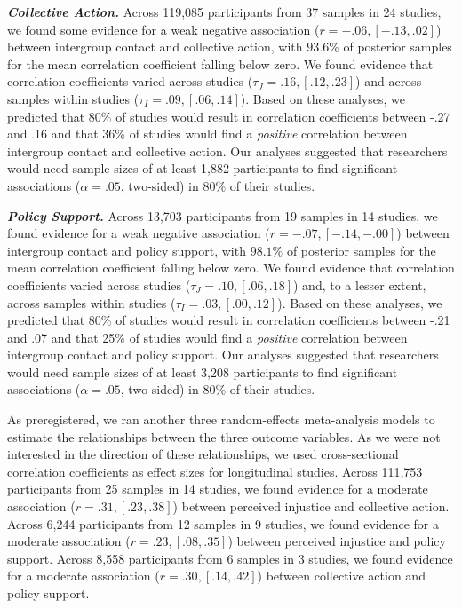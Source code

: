\documentclass[12pt, letterpaper]{article}
\begin{document}
\textbf{\emph{Collective Action.}} Across 119,085 participants from 37
samples in 24 studies, we found some evidence for a weak negative
association (\(r = -.06, [-.13, .02]\)) between intergroup contact and
collective action, with \(93.6\%\) of posterior samples for the mean
correlation coefficient falling below zero. We found evidence that
correlation coefficients varied across studies
(\(\tau_J = .16, [.12, .23]\)) and across samples within studies
(\(\tau_I = .09, [.06, .14]\)). Based on these analyses, we predicted
that 80\% of studies would result in correlation coefficients between
-.27 and .16 and that 36\% of studies would find a \emph{positive}
correlation between intergroup contact and collective action. Our
analyses suggested that researchers would need sample sizes of at least
1,882 participants to find significant associations (\(\alpha = .05\),
two-sided) in 80\% of their studies.

\textbf{\emph{Policy Support.}} Across 13,703 participants from 19
samples in 14 studies, we found evidence for a weak negative association
(\(r = -.07, [-.14, -.00]\)) between intergroup contact and policy
support, with \(98.1\%\) of posterior samples for the mean correlation
coefficient falling below zero. We found evidence that correlation
coefficients varied across studies (\(\tau_J = .10, [.06, .18]\)) and,
to a lesser extent, across samples within studies
(\(\tau_I = .03, [.00, .12]\)). Based on these analyses, we predicted
that 80\% of studies would result in correlation coefficients between
-.21 and .07 and that 25\% of studies would find a \emph{positive}
correlation between intergroup contact and policy support. Our analyses
suggested that researchers would need sample sizes of at least 3,208
participants to find significant associations (\(\alpha = .05\),
two-sided) in 80\% of their studies.

As preregistered, we ran another three random-effects meta-analysis
models to estimate the relationships between the three outcome
variables. As we were not interested in the direction of these
relationships, we used cross-sectional correlation coefficients as
effect sizes for longitudinal studies. Across 111,753 participants from
25 samples in 14 studies, we found evidence for a moderate association
(\(r = .31, [.23, .38]\)) between perceived injustice and collective
action. Across 6,244 participants from 12 samples in 9 studies, we found
evidence for a moderate association (\(r = .23, [.08, .35]\)) between
perceived injustice and policy support. Across 8,558 participants from 6
samples in 3 studies, we found evidence for a moderate association
(\(r = .30, [.14, .42]\)) between collective action and policy support.
\end{document}
